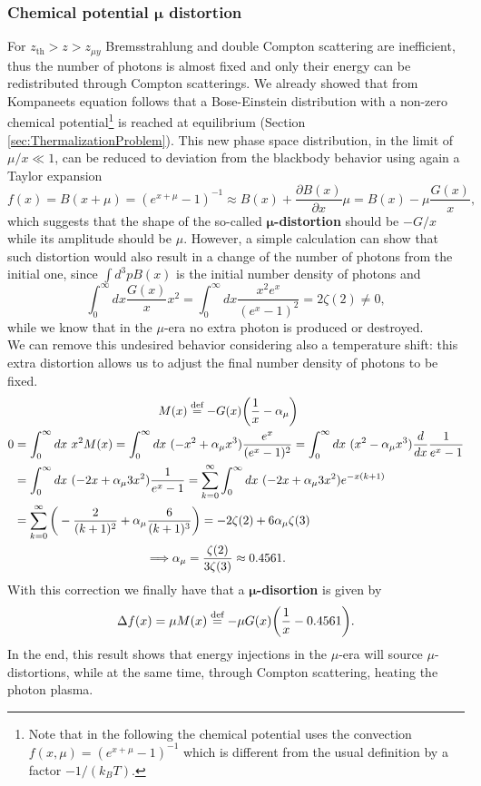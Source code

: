 \subsubsection{Chemical potential $\boldsymbol\mu$ distortion}
For $z_\text{th}>z>z_{\mu y}$ Bremsstrahlung and double Compton scattering are inefficient, thus the number of photons is almost fixed and only their energy can be redistributed through Compton scatterings. We already showed that from Kompaneets equation follows that a Bose-Einstein distribution with a non-zero chemical potential\footnote{Note that in the following the chemical potential uses the convection $f(x,\mu)=(e^{x+\mu}-1)^{-1}$ which is different from the usual definition by a factor $-1/(k_BT)$.} is reached at equilibrium (Section \ref{sec:ThermalizationProblem}). This new phase space distribution, in the limit of $\mu/x\ll1$, can be reduced to deviation from the blackbody behavior using again a Taylor expansion
$$f(x)=B(x+\mu)=(e^{x+\mu}-1)^{-1}\approx B(x)+\frac{\partial B(x)}{\partial x}\mu=B(x)-\mu\frac{G(x)}{x},$$
which suggests that the shape of the so-called $\boldsymbol\mu$\textbf{-distortion} should be $-G/x$ while its amplitude should be $\mu$. However, a simple calculation can show that such distortion would also result in a change of the number of photons from the initial one, since $\int d^3p B(x)$ is the initial number density of photons and
$$\int_0^\infty dx \frac{G(x)}{x}x^2=\int_0^\infty dx \frac{x^2e^x}{(e^x-1)^2}=2\zeta(2)\neq0,$$
while we know that in the $\mu$-era no extra photon is produced or destroyed.\\ 
We can remove this undesired behavior considering also a temperature shift: this extra distortion allows us to adjust the final number density of photons to be fixed.
\begin{align}
    \label{eq:SD_mu}
    &\qquad\qquad\qquad\qquad\qquad\qquad M(x)\defeq-G(x)\bigg(\frac{1}{x}-\alpha_\mu\bigg)\\
    0&=\int_0^\infty dx\ x^2M(x)=\int_0^\infty dx\ (-x^2+\alpha_\mu x^3)\frac{e^x}{(e^x-1)^2}=\int_0^\infty dx\ (x^2-\alpha_\mu x^3)\frac{d}{dx}\frac{1}{e^x-1}\nonumber\\&=\int_0^\infty dx\ (-2x+\alpha_\mu 3x^2)\frac{1}{e^x-1}=\sum_{k=0}^{\infty}\int_0^\infty dx\ (-2x+\alpha_\mu 3x^2)e^{-x(k+1)}\nonumber\\&=\sum_{k=0}^{\infty}\bigg(-\frac{2}{(k+1)^2}+\alpha_\mu\frac{6}{(k+1)^3}\bigg)=-2\zeta(2)+6\alpha_\mu\zeta(3)\nonumber\\
    &\qquad\qquad\qquad\quad\qquad\qquad\Longrightarrow\alpha_\mu=\frac{\zeta(2)}{3\zeta(3)}\approx0.4561.\nonumber
\end{align}
With this correction we finally have that a $\boldsymbol\mu$\textbf{-disortion} is given by$$\Delta f(x)=\mu M(x)\stackrel{\text{def}}{=}-\mu G(x)\bigg(\frac{1}{x}-0.4561\bigg).$$
In the end, this result shows that energy injections in the $\mu$-era will source $\mu$-distortions, while at the same time, through Compton scattering, heating the photon plasma.

